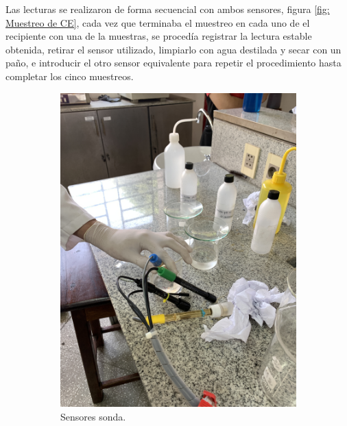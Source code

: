Las lecturas se realizaron de forma secuencial con ambos sensores, figura \ref{fig: Muestreo de CE}, cada vez que terminaba el muestreo en cada uno de el recipiente con una de la muestras, se proced\'ia registrar la lectura estable obtenida, retirar el sensor utilizado, limpiarlo con agua destilada y secar con un pa\~no, e introducir el otro sensor equivalente para repetir el procedimiento hasta completar los cinco muestreos.

\begin{figure}
     \centering
     \begin{subfigure}[b]{0.25\textwidth}
         \centering
         \includegraphics[angle=270,width=\textwidth]{Imagenes/cap4/qca1.jpg}
         \caption{Sensores sonda.}
         \label{fig:calibracionLSD}
     \end{subfigure}
     \hfill
     \begin{subfigure}[b]{0.4\textwidth}
         \centering

\end{subfigure}
\end{figure}
